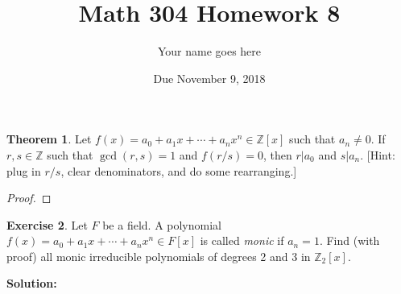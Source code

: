 \documentclass[11pt]{article}		%
\title{Math 304 Homework 8}
\author{Your name goes here}
\date{Due November 9, 2018}
\def\Z{{\mathbb Z}}
\theoremstyle{definition}
\newtheorem{theorem}{Theorem}
\newtheorem{exercise}[theorem]{Exercise}
\begin{document}
\maketitle


\begin{theorem}
	Let $f(x) = a_0 + a_1 x + \cdots + a_n x^n\in \Z[x]$ such that $a_n\ne 0$.
	If $r,s\in\Z$ such that $\gcd(r,s)=1$ and $f(r/s) = 0$, then $r| a_0$ and $s|a_n$.
	[Hint: plug in $r/s$, clear denominators, and do some rearranging.]
\end{theorem}

\begin{proof}

\end{proof}





\begin{exercise}
	Let $F$ be a field.
	A polynomial $f(x) = a_0 + a_1 x+ \cdots + a_n x^n \in F[x]$ is called \emph{monic} if $a_n = 1$.
	Find (with proof) all monic irreducible polynomials of degrees 2 and 3 in $\Z_2[x]$. 
\end{exercise}


\noindent\textbf{Solution:} 
 
\end{document}

